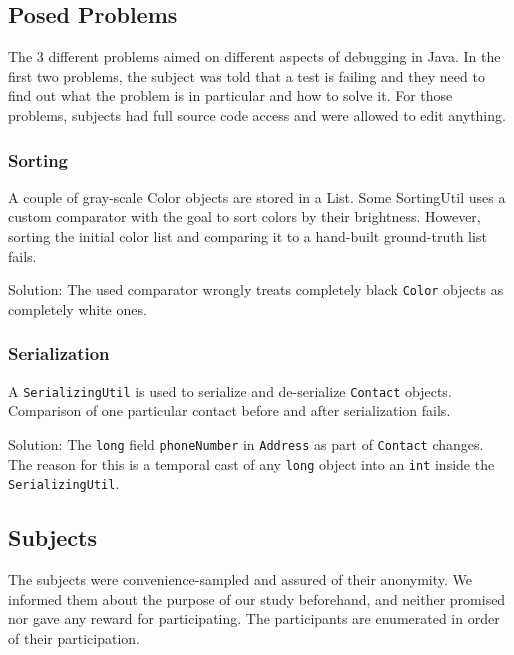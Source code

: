\documentclass[english]{scrartcl}
\begin{document}
\subsection{Posed Problems}
The 3 different problems aimed on different aspects of debugging in Java.
In the first two problems, the subject was told that a test is failing and they need to find out what the problem is in particular and how to solve it.
For those problems, subjects had full source code access and were allowed to edit anything.

\subsubsection{Sorting}
A couple of gray-scale Color objects are stored in a List.
Some SortingUtil uses a custom comparator with the goal to sort colors by their brightness.
However, sorting the initial color list and comparing it to a hand-built ground-truth list fails.

Solution: The used comparator wrongly treats completely black \texttt{Color} objects as completely white ones.

\subsubsection{Serialization}
A \texttt{SerializingUtil} is used to serialize and de-serialize \texttt{Contact} objects.
Comparison of one particular contact before and after serialization fails.

Solution: The \texttt{long} field \texttt{phoneNumber} in \texttt{Address} as part of \texttt{Contact} changes.
The reason for this is a temporal cast of any \texttt{long} object into an \texttt{int} inside the \texttt{SerializingUtil}.

\subsection{Subjects}
The subjects were convenience-sampled and assured of their anonymity. We informed them about the purpose of our study beforehand, and neither promised nor gave any reward for participating. The participants are enumerated in order of their participation.
\end{document}
